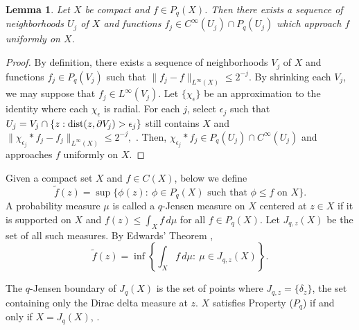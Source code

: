 \documentclass[12pt]{amsart}
\newtheorem{lem}[theorem]{Lemma}
\numberwithin{equation}{section}
{\theoremstyle{definition}
\newtheorem{remark}[theorem]{Remark}
}
\begin{document}
 \begin{lem}\label{smooth approximation}
     Let $X$ be compact and $f \in P_q(X)$.  Then there exists a sequence of neighborhoods $U_j$ of $X$ and functions $f_j \in C^{\infty}(U_j)\cap P_q(U_j)$ which approach $f$ uniformly on $X$.
 \end{lem}
 \begin{proof}
     By definition, there exists a sequence of neighborhoods $V_j$ of $X$ and functions $f_j \in P_q(V_j)$ such that
     $
     \|f_j - f\|_{L^{\infty}(X)} \leq 2^{-j}.
     $
     By shrinking each $V_j$, we may suppose that $f_j \in L^{\infty}(V_j)$.  Let $\{\chi_{\epsilon}\}$
 be an approximation to the identity where each $\chi_{\epsilon}$ is radial.  For each $j$, select $\epsilon_j$ such that 
 $
U_j = V_j \cap \{z: \hbox{dist}(z, \partial V_j) > \epsilon_j\}
 $
 still contains $X$ and
 $
 \|\chi_{\epsilon_j} * f_j - f_j\|_{L^{\infty}(X)} \leq 2^{-j},
 $
 \cite[8.14 Theorem]{Fo99}.  Then, $ \chi_{\epsilon_j} *f_j \in P_q(U_j) \cap C^{\infty}(U_j)$ \cite[Proposition 1.2]{AhDi09} and approaches $f$ uniformly on $X$.
 \end{proof}




Given a compact set $X$ and $f\in C(X)$, below we define
$$\tilde{f}(z)=\sup\{\phi(z):\ \phi\in P_q(X)\textrm{ such that }\phi\leq f\textrm{ on }X\}.$$
A probability measure $\mu$ is called a $q$-Jensen measure on $X$ centered at $z \in X$ if it is supported on $X$ and $f(z) \leq \int_X f\, d\mu$ for all $f \in P_q(X)$.   Let $J_{q,z}(X)$ be the set of all such measures. By Edwards' Theorem \cite[(4.40), p.89]{St10} \cite[1.2 Theorem]{Ga78},
\begin{equation}\label{Edwards Theorem}
\tilde{f}(z)=\inf\left\{\int_X f\,d\mu:\ \mu\in J_{q,z}(X)\right\}.
\end{equation}

The $q$-Jensen boundary of $J_q(X)$ is the set of points where $J_{q, z} = \{\delta_z\}$, the set containing only the Dirac delta measure at $z$.  $X$ satisfies Property ($P_q$) if and only if $X = J_q(X)$, \cite[Section 4.5]{St10}.
\end{document}
